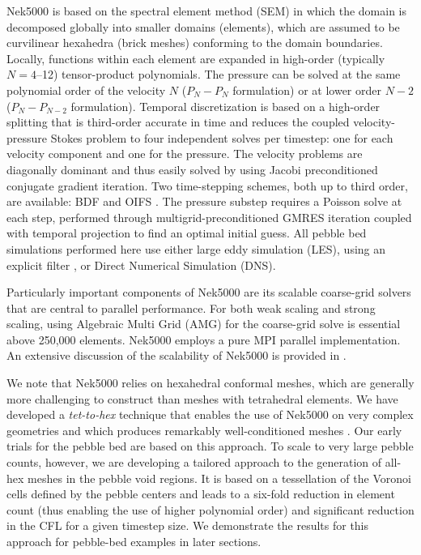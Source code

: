 Nek5000 is based on the spectral element method (SEM) \cite{patera1984} in which  the domain is decomposed 
globally into smaller domains (elements), which are assumed to be curvilinear hexahedra (brick meshes) 
conforming to the domain boundaries. Locally, functions within each element are expanded in high-order
(typically $N=4$--12) tensor-product polynomials.
The pressure can be solved at the same polynomial order of the velocity $N$ ($P_{N} - P_{N}$ formulation)
or at lower order $N-2$ ($P_{N} - P_{N-2}$ formulation). 
Temporal discretization is based on a high-order splitting that is third-order
accurate in time and reduces the coupled velocity-pressure Stokes problem to
four independent solves per timestep: one for each velocity component and one
for the pressure. The velocity problems are diagonally dominant and thus easily
solved by using Jacobi preconditioned conjugate gradient iteration. Two
time-stepping schemes, both up to third order, are available: BDF and OIFS
\cite{fischer2003implementation}. The pressure substep requires a Poisson solve
at each step, performed through multigrid-preconditioned GMRES iteration
coupled with temporal projection to find an optimal initial guess.
All pebble bed simulations performed here use either large eddy simulation (LES), 
using an explicit filter \cite{fischer2001filter}, or Direct Numerical Simulation (DNS).


Particularly important components of Nek5000 are its scalable coarse-grid solvers that are central to
parallel performance. For both weak scaling and strong scaling, using Algebraic Multi Grid (AMG) for the
coarse-grid solve is essential above 250,000 elements. Nek5000 employs a pure MPI parallel implementation.
An extensive discussion of the scalability of Nek5000 is provided in \cite{fischer15,fischer20a}.

We note that Nek5000 relies on hexahedral conformal meshes, which are generally
more challenging to construct than meshes with tetrahedral elements.  We have
developed a \textit{tet-to-hex} technique that enables the use of Nek5000 on very 
complex geometries and which produces remarkably well-conditioned meshes
\cite{yuan2020spectral}.  Our early trials for the pebble bed are based on this
approach.  To scale to very large pebble counts, however, we are developing a
tailored approach to the generation of all-hex meshes in the pebble void regions.
It is based on a tessellation of the Voronoi cells defined by the pebble
centers and leads to a six-fold reduction in element count (thus
enabling the use of higher polynomial order) and significant reduction in the
CFL for a given timestep size.  We demonstrate the results for this approach 
for pebble-bed examples in later sections.

